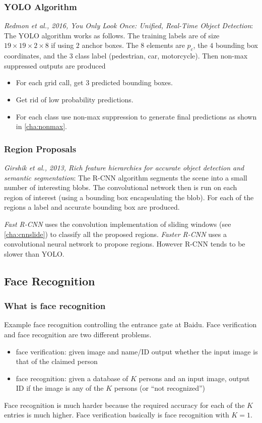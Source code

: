 \documentclass{article}
\begin{document}
\subsubsection{YOLO Algorithm}
\emph{Redmon et al., 2016, You Only Look Once: Unified, Real-Time Object Detection}:
The YOLO algorithm works as follows.
The training labels are of size $19\times 19\times 2\times 8$ if using $2$ anchor boxes.
The $8$ elements are $p_c$, the $4$ bounding box coordinates, and the $3$ class label (pedestrian, car, motorcycle).
Then non-max suppressed outputs are produced
\begin{itemize}
  \item For each grid call, get $3$ predicted bounding boxes.
  \item Get rid of low probability predictions.
  \item For each class use non-max suppression to generate final predictions as shown in \cref{cha:nonmax}.
\end{itemize}

\subsubsection{Region Proposals}
\emph{Girshik et al., 2013, Rich feature hierarchies for accurate object detection and semantic segmentation}:
The R-CNN algorithm segments the scene into a small number of interesting blobs.
The convolutional network then is run on each region of interest (using a bounding box encapsulating the blob).
For each of the regions a label and accurate bounding box are produced.

\emph{Fast R-CNN} uses the convolution implementation of sliding windows (see \cref{cha:cnnslide}) to classify all the proposed regions.
\emph{Faster R-CNN} uses a convolutional neural network to propose regions.
However R-CNN tends to be slower than YOLO.

\subsection{Face Recognition}
\subsubsection{What is face recognition}
Example face recognition controlling the entrance gate at Baidu.
Face verification and face recognition are two different problems.
\begin{itemize}
  \item face verification: given image and name/ID output whether the input image is that of the claimed person
  \item face recognition: given a database of $K$ persons and an input image, output ID if the image is any of the $K$ persons (or ``not recognized'')
\end{itemize}
Face recognition is much harder because the required accuracy for each of the $K$ entries is much higher.
Face verification basically is face recognition with $K=1$.
\end{document}

